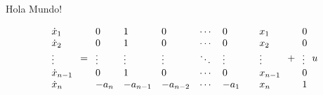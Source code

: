 Hola Mundo!

\begin{equation}
\begin{array}{l}
\dot{x}_{1} \\ 
\dot{x}_{2} \\
\vdots \\
\dot{x}_{n-1} \\ 
\dot{x}_{n} \\ 
\end{array}
=
\begin{array}{llllll}
0 & 1 & 0 & \cdots & 0 \\
0 & 1 & 0 & \cdots & 0 \\
\vdots & \vdots & \vdots & \ddots  & \vdots \\
0 & 1 & 0 & \cdots & 0 \\
-a_{n} & -a_{n-1} & -a_{n-2} & \cdots & -a_{1} &
\end{array}
\begin{array}{l}
x_{1} \\ 
x_{2} \\
\vdots \\
x_{n-1} \\ 
x_{n} \\ 
\end{array}
+
\begin{array}{l}
0 \\
0 \\
\vdots \\
0 \\
1 \\
\end{array}
u
\\
\\
\end{equation}

